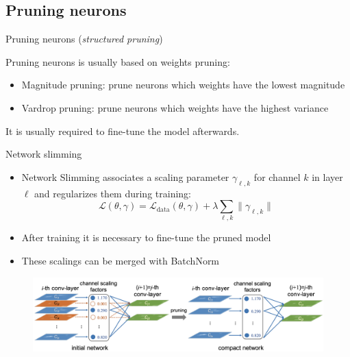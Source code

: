 \documentclass[10pt, handout]{beamer}
\begin{document}
\subsection{Pruning neurons}
\begin{frame}{Pruning neurons (\textit{structured pruning})}

\pause
Pruning neurons is usually based on weights pruning:
\begin{itemize}
    \pause\item Magnitude pruning: prune neurons which weights have the lowest magnitude
    \pause\item Vardrop pruning: prune neurons which weights have the highest variance
\end{itemize}

\pause
It is usually required to fine-tune the model afterwards.
\end{frame}


\begin{frame}{Network slimming}
\begin{itemize}
    \pause\item Network Slimming \cite{Network_slimming} associates a scaling parameter $\gamma_{\ell, k}$ for channel $k$ in layer $\ell$ and regularizes them during training:
    \begin{equation}
        \mathcal{L}(\theta, \gamma) = \mathcal{L}_\text{data}(\theta, \gamma) + \lambda \sum_{\ell, k} \| \gamma_{\ell, k} \|
    \end{equation}
    \pause\item After training it is necessary to fine-tune the pruned model
    \pause\item These scalings can be merged with BatchNorm
\end{itemize}

\pause
\begin{figure}
    \centering
    \includegraphics[width=\textwidth]{images/network-slimming.png}
\end{figure}
\end{frame}
\end{document}
